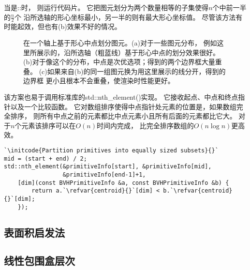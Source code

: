 当是{\ttfamily{}::}时，
则运行代码片。
它把图元划分为两个数量相等的子集使得$n$个中前一半的$\displaystyle\frac{n}{2}$个
沿所选轴的形心坐标最小，另一半的则有最大形心坐标值。
尽管该方法有时能起效，但也有(b)效果不好的情况。
\begin{figure}[htbp]
    \centering
    \caption{在一个轴上基于形心中点划分图元。(a)对于一些图元分布，
        例如这里所展示的，沿所选轴（粗蓝线）基于形心中点的划分效果很好。
        (b)对于像这个的分布，中点是次优选项；得到的两个边界框大量重叠。
        (c)如果来自(b)的同一组图元换为用这里展示的线分开，得到的边界框
        更小且根本不会重叠，使渲染时性能更好。}
    \label{fig:4.4}
\end{figure}

该方案也易于调用标准库的{\ttfamily std::nth\_element()}实现。
它接收起点、中点和终点指针以及一个比较函数。
它对数组排序使得中点指针处元素的位置是，如果数组完全排序，
则所有中点之前的元素都比中点元素小且所有后面的元素都比它大。
对于$n$个元素该排序可以在$O(n)$时间内完成，
比完全排序数组的$O(n\log{n})$更高效。
\begin{lstlisting}
`\initcode{Partition primitives into equally sized subsets}{}`
mid = (start + end) / 2;
std::nth_element(&primitiveInfo[start], &primitiveInfo[mid], 
                 &primitiveInfo[end-1]+1,
    [dim](const BVHPrimitiveInfo &a, const BVHPrimitiveInfo &b) { 
        return a.`\refvar{centroid}{}`[dim] < b.`\refvar{centroid}{}`[dim];
    });
\end{lstlisting}

\subsection{表面积启发法}\label{sub:表面积启发法}

\subsection{线性包围盒层次}\label{sub:线性包围盒层次}